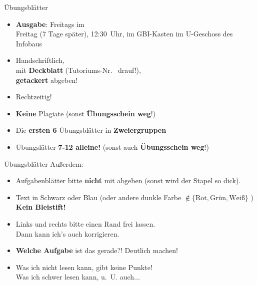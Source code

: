 \begin{frame}{Übungsblätter}
	\begin{itemize}
		\item \textbf{Ausgabe}: Freitags im \ILIAS \\
			   Freitag (7 Tage später), 12:30~Uhr, im GBI-Kasten im U-Geschoss des Infobaus
		\pause
		\item Handschriftlich, \\ 
		mit \textbf{Deckblatt} (Tutoriums-Nr. \mytutnumber\  drauf!), \\ 
		\textbf{getackert} abgeben!
		\item Rechtzeitig! 
		\item \textbf{Keine} Plagiate (sonst \textbf{Übungsschein weg}!)
		\item Die \textbf{ersten 6} Übungsblätter in \textbf{Zweiergruppen}
		\item Übungslätter \textbf{7-12 alleine!} (sonst auch \textbf{Übungsschein weg}!)
	\end{itemize}
\end{frame}

\begin{frame}{Übungsblätter}
	Außerdem:
	\begin{itemize}
		\item Aufgabenblätter bitte \textbf{nicht} mit abgeben (sonst wird der Stapel so dick).
		\item Text in Schwarz oder Blau (oder andere dunkle Farbe $\notin \{\text{Rot}, \text{Grün}, \text{Weiß}\}$ ) \\
			  \textbf{Kein Bleistift!}
		\item Links und rechts bitte einen Rand frei lassen. \\
			  Dann kann ich's auch korrigieren. \smiley
		\item \textbf{Welche Aufgabe} ist das gerade?! \impl Deutlich machen!
		\item Was ich nicht lesen kann, gibt keine Punkte! \\
			  \small Was ich schwer lesen kann, u.~U. auch... 
	\end{itemize}
\end{frame}



